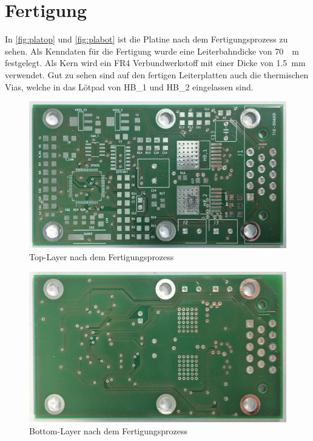 \section{Fertigung}
In \autoref{fig:platop} und \autoref{fig:plabot} ist die Platine nach dem Fertigungsprozess zu sehen. Als Kenndaten für die Fertigung wurde eine Leiterbahndicke von \SI{70}{\mu m} festgelegt. Als Kern wird ein FR4 Verbundwerkstoff mit einer Dicke von \SI{1,5}{mm} verwendet. Gut zu sehen sind auf den fertigen Leiterplatten auch die thermischen Vias, welche in das Lötpad von HB\_1 und HB\_2 eingelassen sind.
\begin{figure}[H]%
\centering
\includegraphics[width=400pt]{./Bilder/pla_top2}%
\caption{Top-Layer nach dem Fertigungsprozess}%
\label{fig:platop}%
\end{figure}
\begin{figure}[H]%
\centering
\includegraphics[width=400pt]{./Bilder/pla_bot2}%
\caption{Bottom-Layer nach dem Fertigungsprozess}%
\label{fig:plabot}%
\end{figure}